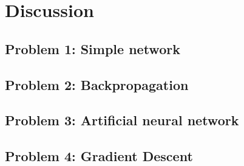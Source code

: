 \chapter{Discussion}
\section{Problem 1: Simple network}
\section{Problem 2: Backpropagation}
\section{Problem 3: Artificial neural network}
\section{Problem 4: Gradient Descent}
